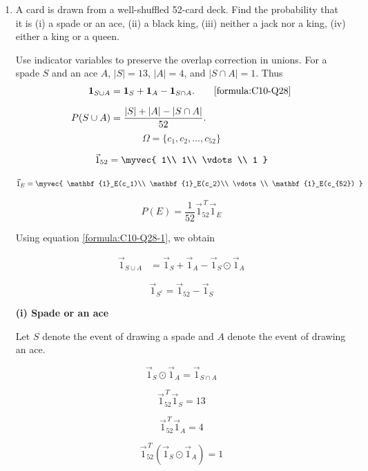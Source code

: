\begin{enumerate}[label=\thesubsection.\arabic*, ref=\thesubsection.\theenumi]
    \item
    \label{question:C10-Q28}
    \label{question-short:C10-Q28} A card is drawn from a well-shuffled 52-card deck. Find the probability that it is (i) a spade or an ace, (ii) a black king, (iii) neither a jack nor a king, (iv) either a king or a queen.

    \par
    \smallskip
    \solution

    Use indicator variables to preserve the overlap correction in unions. For a spade $S$ and an ace $A$, $|S|=13$, $|A|=4$, and $|S\cap A|=1$. Thus
\begin{align*}
    \mathbf 1_{S\cup A}
    &= \mathbf 1_S+\mathbf 1_A-\mathbf 1_{S\cap A}.
    \tag*{\eqref{formula:C10-Q28}}\\[6pt]
    P(S\cup A)
    &= \frac{|S|+|A|-|S\cap A|}{52}.
\end{align*}
\[
\Omega=\{c_1,c_2,\ldots,c_{52}\}
\]

\[
\vec{1}_{52}=
\myvec{
1\\
1\\
\vdots\\
1
}
\]

\[
\vec{1}_E=
\myvec{
\mathbf{1}_E(c_1)\\
\mathbf{1}_E(c_2)\\
\vdots\\
\mathbf{1}_E(c_{52})
}
\]

\[
P(E)=\frac{1}{52}\vec{1}_{52}^{\,T}\vec{1}_E
\]

Using equation \eqref{formula:C10-Q28-1}, we obtain

\begin{align*}
    \vec{1}_{S\cup A}
    &= \vec{1}_S+\vec{1}_A-
    \vec{1}_S\odot\vec{1}_A
\end{align*}

\[
\vec{1}_{S^c}=
\vec{1}_{52}-\vec{1}_S
\]

\par
\medskip
\noindent\textbf{(i) Spade or an ace}
\par
\smallskip

Let $S$ denote the event of drawing a spade and
$A$ denote the event of drawing an ace.

\[
\vec{1}_S\odot\vec{1}_A
=
\vec{1}_{S\cap A}
\]

\[
\vec{1}_{52}^{\,T}\vec{1}_S=13
\]

\[
\vec{1}_{52}^{\,T}\vec{1}_A=4
\]

\[
\vec{1}_{52}^{\,T}
(\vec{1}_S\odot\vec{1}_A)=1
\]


\end{enumerate}
